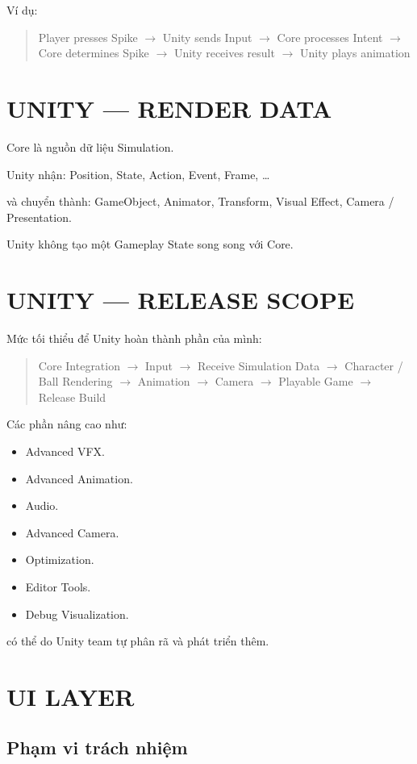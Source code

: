 \documentclass[12pt,a4paper]{article}
\newcommand{\flow}[1]{%
  \begin{quote}\centering\ttfamily #1\end{quote}%
}
\begin{document}
Ví dụ:

\flow{Player presses Spike $\rightarrow$ Unity sends Input $\rightarrow$ Core processes Intent $\rightarrow$ Core determines Spike $\rightarrow$ Unity receives result $\rightarrow$ Unity plays animation}

\section{UNITY --- RENDER DATA}

Core là nguồn dữ liệu Simulation.

Unity nhận: Position, State, Action, Event, Frame, \ldots

và chuyển thành: GameObject, Animator, Transform, Visual Effect, Camera / Presentation.

Unity không tạo một Gameplay State song song với Core.

\section{UNITY --- RELEASE SCOPE}

Mức tối thiểu để Unity hoàn thành phần của mình:

\flow{Core Integration $\rightarrow$ Input $\rightarrow$ Receive Simulation Data $\rightarrow$ Character / Ball Rendering $\rightarrow$ Animation $\rightarrow$ Camera $\rightarrow$ Playable Game $\rightarrow$ Release Build}

Các phần nâng cao như:
\begin{itemize}[nosep]
  \item Advanced VFX.
  \item Advanced Animation.
  \item Audio.
  \item Advanced Camera.
  \item Optimization.
  \item Editor Tools.
  \item Debug Visualization.
\end{itemize}

có thể do Unity team tự phân rã và phát triển thêm.

\section{UI LAYER}

\subsection*{Phạm vi trách nhiệm}
\end{document}
